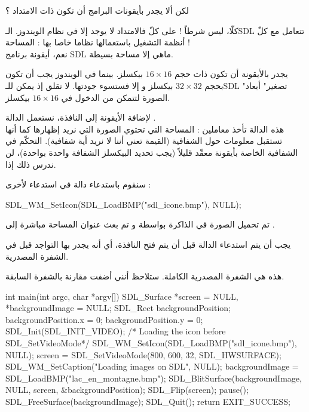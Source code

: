 \begin{question}
لكن ألا يجدر بأيقونات البرامج أن تكون ذات الامتداد
 ؟
\end{question}

كلّا، ليس شرطاً ! على كلّ فالامتداد
لا يوجد إلا في نظام الويندوز. الـ\textenglish{SDL}
تتعامل مع كلّ أنظمة التشغيل باستعمالها نظاما خاصا بها : المساحة !\\
نعم، أيقونة برنامج 
\textenglish{SDL}
ماهي إلا مساحة بسيطة.

\begin{warning}
يجدر بالأيقونة أن تكون ذات حجم 
$16 \times 16$
بيكسلز. بينما في الويندوز يجب أن تكون بحجم
$32 \times 32$
بيكسلز و إلا فستسوء جودتها. لا تقلق إذ يمكن للـ\textenglish{SDL}
"تصغير" أبعاد الصورة لتتمكن من الدخول في 
$16 \times 16$
بيكسلز.
\end{warning}

لإضافة الأيقونة إلى النافذة، نستعمل الدالة 
.\\
هذه الدالة تأخذ معاملين : المساحة التي تحتوي الصورة التي نريد إظهارها كما أنها تستقبل معلومات حول الشفافية (القيمة 
تعني أننا لا نريد أية شفافية). التحكّم في الشفافية الخاصة بأيقونة معقّد قليلاً (يجب تحديد البيكسلز الشفافة واحدة بواحدة)، لن ندرس ذلك إذا.

سنقوم باستدعاء دالة في استدعاء لأخرى :

\begin{Csource}
SDL_WM_SetIcon(SDL_LoadBMP("sdl_icone.bmp"), NULL);
\end{Csource}
 
تم تحميل الصورة في الذاكرة بواسطة
و تم بعث عنوان المساحة مباشرة إلى
.

\begin{critical}
يجب أن يتم استدعاء الدالة
قبل أن يتم فتح النافذة، أي أنه يجدر بها التواجد قبل
في الشفرة المصدرية.
\end{critical}

هذه هي الشفرة المصدرية الكاملة. ستلاحظ أنني أضفت
مقارنة بالشفرة السابقة.

\begin{Csource}
int main(int argc, char *argv[])
{
	SDL_Surface *screen = NULL, *backgroundImage = NULL;
	SDL_Rect backgroundPosition;
	backgroundPosition.x = 0;
	backgroundPosition.y = 0;
	SDL_Init(SDL_INIT_VIDEO);
	/* Loading the icon before SDL_SetVideoMode*/
	SDL_WM_SetIcon(SDL_LoadBMP("sdl_icone.bmp"), NULL);
	screen = SDL_SetVideoMode(800, 600, 32, SDL_HWSURFACE);
	SDL_WM_SetCaption("Loading images on SDL", NULL);
	backgroundImage = SDL_LoadBMP("lac_en_montagne.bmp");
	SDL_BlitSurface(backgroundImage, NULL, screen, &backgroundPosition);
	SDL_Flip(screen);
	pause();
	SDL_FreeSurface(backgroundImage);
	SDL_Quit();
	return EXIT_SUCCESS;
}
\end{Csource}

